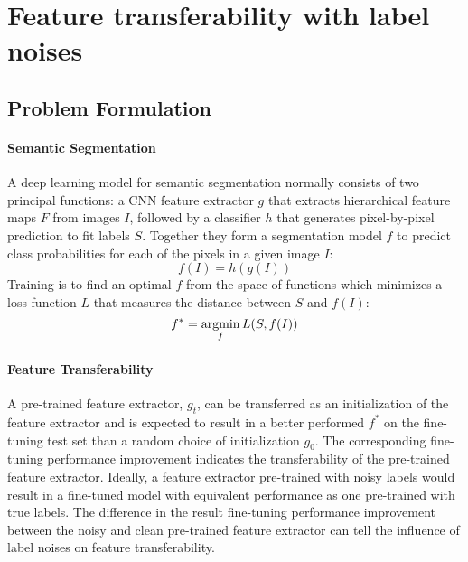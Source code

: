 \section{Feature transferability with label noises}
\label{sec:robustness}


\subsection{Problem Formulation}
\label{subsec:formulation}

\paragraph{Semantic Segmentation}

A deep learning model for semantic segmentation normally consists of two principal functions: a CNN feature extractor $g$ that extracts hierarchical feature maps $F$ from images $I$, followed by a classifier $h$ that generates pixel-by-pixel prediction to fit labels $S$.
Together they form a segmentation model $f$ to predict class probabilities for each of the pixels in a given image $I$:
$$f(I) = h(g(I))$$
Training is to find an optimal $f$ from the space of functions which minimizes a loss function $L$ that measures the distance between $S$ and $f(I)$:
$$f^{\ast} = \operatorname*{argmin}_{f}{L(S, f(I))}$$


\paragraph{Feature Transferability}

A pre-trained feature extractor, $g_t$, can be transferred as an initialization of the feature extractor and is expected to result in a better performed $f^{\ast}$ on the fine-tuning test set than a random choice of initialization $g_0$.
The corresponding fine-tuning performance improvement indicates the transferability of the pre-trained feature extractor.
Ideally, a feature extractor pre-trained with noisy labels would result in a fine-tuned model with equivalent performance as one pre-trained with true labels.
The difference in the result fine-tuning performance improvement between the noisy and clean pre-trained feature extractor can tell the influence of label noises on feature transferability.


